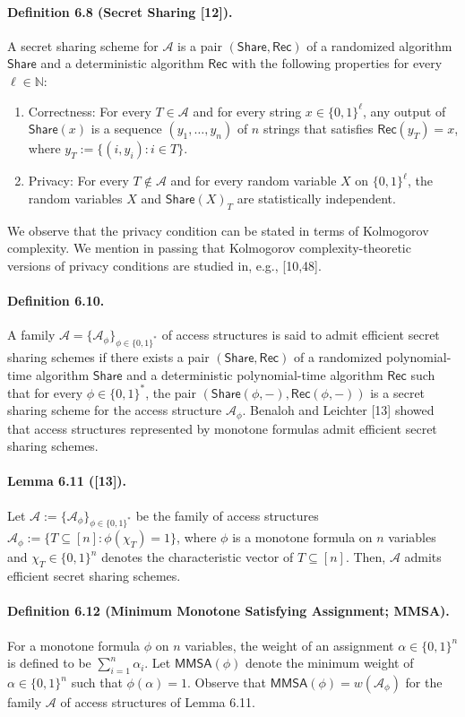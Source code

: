 \paragraph{Definition 6.8 (Secret Sharing [12]).}
A secret sharing scheme for $\mathcal A$ is a pair $(\mathsf{Share},\mathsf{Rec})$ of a randomized algorithm $\mathsf{Share}$ and a deterministic algorithm $\mathsf{Rec}$ with the following properties for every $\ell\in\mathbb N$:
\begin{enumerate}
\item Correctness: For every $T\in\mathcal A$ and for every string $x\in\{0,1\}^\ell$, any output of $\mathsf{Share}(x)$ is a sequence $(y_1,\ldots,y_n)$ of $n$ strings that satisfies $\mathsf{Rec}(y_T)=x$, where $y_T:=\{(i,y_i):i\in T\}$.
\item Privacy: For every $T\notin\mathcal A$ and for every random variable $X$ on $\{0,1\}^\ell$, the random variables $X$ and $\mathsf{Share}(X)_T$ are statistically independent.
\end{enumerate}
We observe that the privacy condition can be stated in terms of Kolmogorov complexity. We mention in passing that Kolmogorov complexity-theoretic versions of privacy conditions are studied in, e.g., [10,48].
\paragraph{Definition 6.10.}
A family $\mathcal A=\{\mathcal A_\phi\}_{\phi\in\{0,1\}^*}$ of access structures is said to admit efficient secret sharing schemes if there exists a pair $(\mathsf{Share},\mathsf{Rec})$ of a randomized polynomial-time algorithm $\mathsf{Share}$ and a deterministic polynomial-time algorithm $\mathsf{Rec}$ such that for every $\phi\in\{0,1\}^*$, the pair $(\mathsf{Share}(\phi,-),\mathsf{Rec}(\phi,-))$ is a secret sharing scheme for the access structure $\mathcal A_\phi$.
Benaloh and Leichter [13] showed that access structures represented by monotone formulas admit efficient secret sharing schemes.
\paragraph{Lemma 6.11 ([13]).}
Let $\mathcal A:=\{\mathcal A_\phi\}_{\phi\in\{0,1\}^*}$ be the family of access structures $\mathcal A_\phi:=\{T\subseteq[n]:\phi(\chi_T)=1\}$, where $\phi$ is a monotone formula on $n$ variables and $\chi_T\in\{0,1\}^n$ denotes the characteristic vector of $T\subseteq[n]$. Then, $\mathcal A$ admits efficient secret sharing schemes.
\paragraph{Definition 6.12 (Minimum Monotone Satisfying Assignment; MMSA).}
For a monotone formula $\phi$ on $n$ variables, the weight of an assignment $\alpha\in\{0,1\}^n$ is defined to be $\sum_{i=1}^n\alpha_i$. Let $\mathsf{MMSA}(\phi)$ denote the minimum weight of $\alpha\in\{0,1\}^n$ such that $\phi(\alpha)=1$.
Observe that $\mathsf{MMSA}(\phi)=w(\mathcal A_\phi)$ for the family $\mathcal A$ of access structures of Lemma 6.11.

